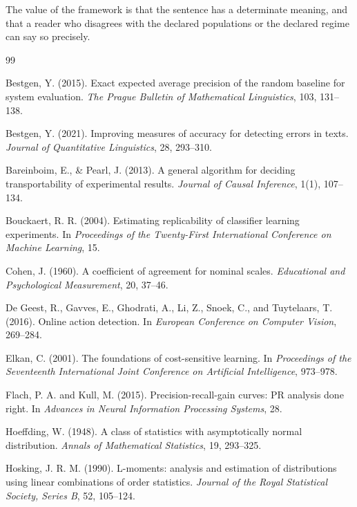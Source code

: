 \documentclass[11pt]{article}
\theoremstyle{remark}
\begin{document}
The value of the framework is that the sentence has a determinate meaning, and that a reader who disagrees with the declared populations or the declared regime can say so precisely.

\begin{thebibliography}{99}

Bestgen, Y. (2015).
Exact expected average precision of the random baseline for system evaluation.
\emph{The Prague Bulletin of Mathematical Linguistics}, 103, 131--138.

Bestgen, Y. (2021).
Improving measures of accuracy for detecting errors in texts.
\emph{Journal of Quantitative Linguistics}, 28, 293--310.

Bareinboim, E., \& Pearl, J. (2013).
A general algorithm for deciding transportability of experimental results.
\emph{Journal of Causal Inference}, 1(1), 107--134.

Bouckaert, R. R. (2004).
Estimating replicability of classifier learning experiments.
In \emph{Proceedings of the Twenty-First International Conference on Machine Learning}, 15.

Cohen, J. (1960).
A coefficient of agreement for nominal scales.
\emph{Educational and Psychological Measurement}, 20, 37--46.

De Geest, R., Gavves, E., Ghodrati, A., Li, Z., Snoek, C., and Tuytelaars, T. (2016).
Online action detection.
In \emph{European Conference on Computer Vision}, 269--284.

Elkan, C. (2001).
The foundations of cost-sensitive learning.
In \emph{Proceedings of the Seventeenth International Joint Conference on Artificial Intelligence}, 973--978.

Flach, P. A. and Kull, M. (2015).
Precision-recall-gain curves: PR analysis done right.
In \emph{Advances in Neural Information Processing Systems}, 28.

Hoeffding, W. (1948).
A class of statistics with asymptotically normal distribution.
\emph{Annals of Mathematical Statistics}, 19, 293--325.

Hosking, J. R. M. (1990).
L-moments: analysis and estimation of distributions using linear combinations of order statistics.
\emph{Journal of the Royal Statistical Society, Series B}, 52, 105--124.


\end{thebibliography}
\end{document}
